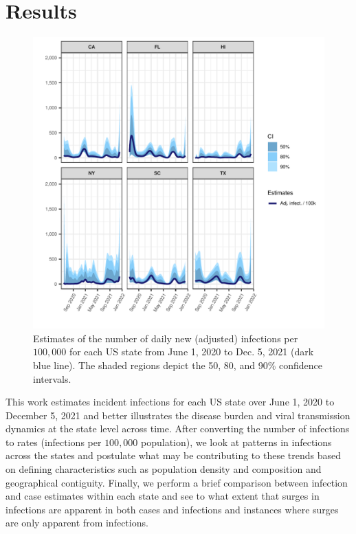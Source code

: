 \documentclass{article}
\begin{document}
\section{Results}

\begin{figure}[!tb]
\centering
    \includegraphics[width=.99\textwidth]{state_nia_est_faceted.pdf} 
    \caption{Estimates of the number of daily new (adjusted) infections per 
    $100,000$ for each US state from June 1, 2020 to Dec. 5, 2021 (dark blue 
    line). The shaded regions depict the 50, 80, and 90\% confidence intervals.}
    \label{fig:state_nia_est_faceted}
\end{figure}

This work estimates incident infections for each US state over June 1,
2020 to December 5, 2021 and better illustrates the disease burden and viral
transmission dynamics at the state level across time. After converting the number
of infections to rates (infections per $100,000$ population), we look at
patterns in infections across the states and postulate what may be contributing
to these trends based on defining characteristics such as population density and 
composition and geographical contiguity. Finally, we perform a
brief comparison between infection and case estimates within each state and see
to what extent that surges in infections are apparent in both cases and infections
and instances where surges are only apparent from infections.
\end{document}
